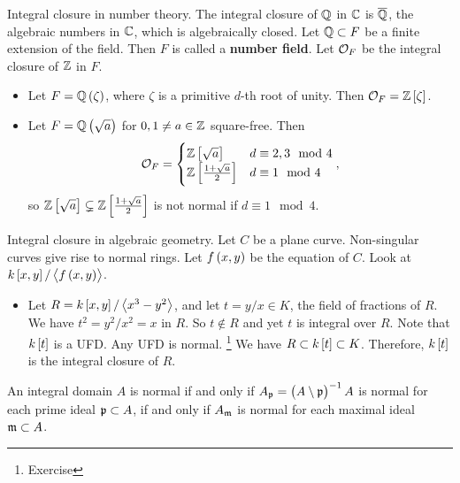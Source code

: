 
\begin{example*}
Integral closure in number theory. The integral closure of $ \mathbb{Q} $ in $ \mathbb{C} $ is $ \overline{\mathbb{Q}} $, the algebraic numbers in $ \mathbb{C} $, which is algebraically closed. Let $ \mathbb{Q} \subset F $ be a finite extension of the field. Then $ F $ is called a \textbf{number field}. Let $ \mathcal{O}_F $ be the integral closure of $ \mathbb{Z} $ in $ F $.
\begin{itemize}
\item Let $ F = \QQ\br{\zeta} $, where $ \zeta $ is a primitive $ d $-th root of unity. Then $ \OOO_F = \ZZ\sbr{\zeta} $.
\item Let $ F = \QQ\br{\sqrt{a}} $ for $ 0, 1 \ne a \in \mathbb{Z} $ square-free. Then
$$ \OOO_F =
\begin{cases}
\ZZ\sbr{\sqrt{a}} & d \equiv 2, 3 \mod 4 \\
\ZZ\sbr{\tfrac{1 + \sqrt{a}}{2}} & d \equiv 1 \mod 4
\end{cases},
$$
so $ \ZZ\sbr{\sqrt{a}} \subsetneq \ZZ\sbr{\tfrac{1 + \sqrt{a}}{2}} $ is not normal if $ d \equiv 1 \mod 4 $.
\end{itemize}
\end{example*}

\begin{example*}
Integral closure in algebraic geometry. Let $ C $ be a plane curve. Non-singular curves give rise to normal rings. Let $ f\br{x, y} $ be the equation of $ C $. Look at $ k\sbr{x, y} / \abr{f\br{x, y}} $.
\begin{itemize}
\item Let $ R = k\sbr{x, y} / \abr{x^3 - y^2} $, and let $ t = y / x \in K $, the field of fractions of $ R $. We have $ t^2 = y^2 / x^2 = x $ in $ R $. So $ t \notin R $ and yet $ t $ is integral over $ R $. Note that $ k\sbr{t} $ is a UFD. Any UFD is normal. \footnote{Exercise} We have $ R \subset k\sbr{t} \subset K $. Therefore, $ k\sbr{t} $ is the integral closure of $ R $.
\end{itemize}
\end{example*}

\begin{proposition}
\label{prop:14.5}
An integral domain $ A $ is normal if and only if $ A_\ppp = \br{A \setminus \ppp}^{-1}A $ is normal for each prime ideal $ \mathfrak{p} \subset A $, if and only if $ A_{\mathfrak{m}} $ is normal for each maximal ideal $ \mathfrak{m} \subset A $.
\end{proposition}

